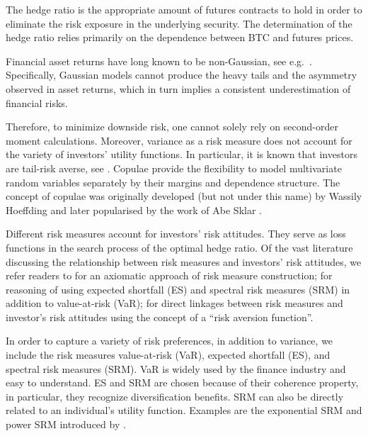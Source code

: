 \documentclass[11pt,a4paper,english]{article}
\begin{document}
The hedge ratio is the appropriate amount of futures contracts to hold
in order to eliminate the risk exposure in the underlying security.   
The determination of the hedge ratio relies primarily
on the dependence between BTC and futures prices.

Financial asset returns have long known to be non-Gaussian, see e.g.\
\citep{fama1963mandelbrot,Cont2001}. Specifically, Gaussian models
cannot produce the heavy tails and the asymmetry observed in 
asset returns, which in turn implies a consistent underestimation of
financial risks. 

Therefore, to minimize downside risk, one cannot solely rely on
second-order moment calculations. Moreover, variance as a risk measure
does not account for the variety of investors' utility functions. In
particular, it is known that  
investors are tail-risk averse, see \cite{menezes1980increasing}.
Copulae provide the flexibility to model multivariate random variables
separately by their margins and dependence structure.
The concept of copulae was originally developed (but not under this
name) by Wassily Hoeffding \citep{hoeffding1940masstabinvariante}
and later popularised by the work of Abe Sklar \citep{Sklar1959}.

Different risk measures account for investors' risk attitudes.
They serve as loss functions in the search process of the optimal
hedge ratio. Of the vast literature discussing the relationship between
risk measures and investors' risk attitudes, we refer readers to
\citet{artzner1999coherent} for an axiomatic 
approach of risk measure construction;
\citet{embrechts2002correlation} for reasoning of using expected
shortfall (ES) and spectral risk measures (SRM) in addition to
value-at-risk (VaR);
\citet{Acerbi2002} for direct linkages between risk measures and
investor's risk attitudes using the concept of a ``risk aversion
function''. 


In order to capture a variety of risk preferences, in addition to
variance, we include the risk measures value-at-risk (VaR), expected
shortfall (ES), and spectral risk measures (SRM). 
VaR is widely used by the finance industry and easy to understand. 
ES and SRM are chosen because of their coherence property, in
particular, they recognize diversification benefits.
SRM can also be directly related to an individual's utility function.
Examples are the exponential SRM and power SRM introduced by
\citet{dowd2008spectral}. 
\end{document}
